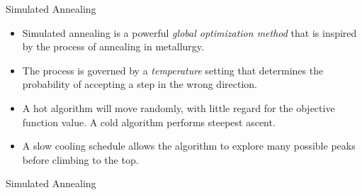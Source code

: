 \documentclass{beamer}
\begin{document}

\begin{frame}{Simulated Annealing}
\begin{itemize}
\item Simulated annealing is a powerful \emph{global optimization method} that is inspired by the process of annealing in metallurgy. 
\item  The process is governed by a \emph{temperature} setting that determines the probability of accepting a step in the wrong direction.
\item  A hot algorithm will move randomly, with little regard for the objective function value.  A cold algorithm performs steepest ascent.
\item A slow cooling schedule allows the algorithm to explore many possible peaks before climbing to the top.
\end{itemize}
\end{frame}


\begin{frame}[fragile]{Simulated Annealing}

\begin{algorithm}[H]
\SetAlgoLined
{}
\caption{Simulated Annealing Algorithm}
\end{algorithm}

\end{frame}
\end{document}
